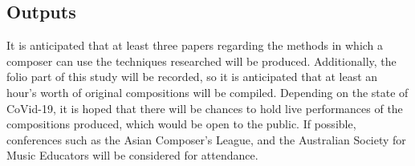 \subsection{Outputs}
It is anticipated that at least three papers regarding the methods in which a composer can use the techniques researched will be produced. 
Additionally, the folio part of this study will be recorded, so it is anticipated that at least an hour's worth of original compositions will be compiled.
Depending on the state of CoVid-19, it is hoped that there will be chances to hold live performances of the compositions produced, which would be open to the public.
If possible, conferences such as the Asian Composer's League, and the Australian Society for Music Educators will be considered for attendance.